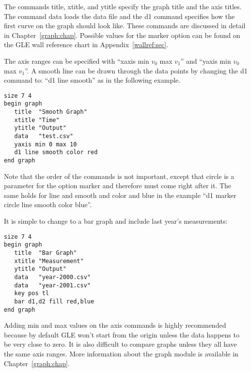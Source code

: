 The commands {\sf title}, {\sf xtitle}, and {\sf ytitle} specify the graph title and the axis titles. The command {\sf data} loads the data file and the {\sf d1} command specifies how the first curve on the graph should look like. These commands are discussed in detail in Chapter~\ref{graph:chap}. Possible values for the {\sf marker} option can be found on the GLE wall reference chart in Appendix~\ref{wallref:sec}.

The axis ranges can be specified with ``{\sf xaxis min $v_0$ max $v_1$}'' and ``{\sf yaxis min $v_0$ max $v_1$}''. A smooth line can be drawn through the data points by changing the d1 command to: ``{\sf d1 line smooth}'' as in the following example.

\preglegraph{}
\begin{minipage}[c]{8cm}
\begin{Verbatim}
size 7 4
begin graph
   title  "Smooth Graph"
   xtitle "Time"
   ytitle "Output"
   data   "test.csv"
   yaxis min 0 max 10
   d1 line smooth color red
end graph
\end{Verbatim}
\end{minipage}
\hfill
\begin{minipage}[c]{7cm}
\mbox{}
\end{minipage}
\postglegraph{}

Note that the order of the commands is not important, except that {\sf circle} is a parameter for the option {\sf marker} and therefore must come right after it. The same holds for line and smooth and color and blue in the example ``d1 marker circle line smooth color blue''.

It is simple to change to a bar graph and include last year's measurements:

\preglegraph{}
\begin{minipage}[c]{8cm}
\begin{Verbatim}
size 7 4
begin graph
   title  "Bar Graph"
   xtitle "Measurement"
   ytitle "Output"
   data   "year-2000.csv"
   data   "year-2001.csv"
   key pos tl
   bar d1,d2 fill red,blue
end graph
\end{Verbatim}
\end{minipage}
\hfill
\begin{minipage}[c]{7cm}
\mbox{}
\end{minipage}
\postglegraph{}

Adding min and max values on the axis commands is highly recommended because by default GLE won't start from the origin unless the data happens to be very close to zero. It is also difficult to compare graphs unless they all have the same axis ranges. More information about the graph module is available in Chapter~\ref{graph:chap}.

